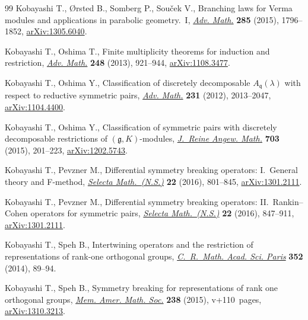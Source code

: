 \documentclass[pdftex]{sigma}
\numberwithin{equation}{section}
\begin{document}
\begin{thebibliography}{99}
Kobayashi T., {\O}rsted B., Somberg P., Sou\v{c}ek V., Branching laws for
 {V}erma modules and applications in parabolic geometry.~{I}, \href{https://doi.org/10.1016/j.aim.2015.08.020}{\textit{Adv.
 Math.}} \textbf{285} (2015), 1796--1852, \href{https://arxiv.org/abs/1305.6040}{arXiv:1305.6040}.

Kobayashi T., Oshima T., Finite multiplicity theorems for induction and
 restriction, \href{https://doi.org/10.1016/j.aim.2013.07.015}{\textit{Adv. Math.}} \textbf{248} (2013), 921--944,
 \href{https://arxiv.org/abs/1108.3477}{arXiv:1108.3477}.

Kobayashi T., Oshima Y., Classification of discretely decomposable
 {$A_{\mathfrak q}(\lambda)$} with respect to reductive symmetric pairs,
 \href{https://doi.org/10.1016/j.aim.2012.07.006}{\textit{Adv. Math.}} \textbf{231} (2012), 2013--2047, \href{https://arxiv.org/abs/1104.4400}{arXiv:1104.4400}.

Kobayashi T., Oshima Y., Classification of symmetric pairs with discretely
 decomposable restrictions of {$(\mathfrak{g},K)$}-modules, \href{https://doi.org/10.1515/crelle-2013-0045}{\textit{J.~Reine
 Angew. Math.}} \textbf{703} (2015), 201--223, \href{https://arxiv.org/abs/1202.5743}{arXiv:1202.5743}.

Kobayashi T., Pevzner M., Differential symmetry breaking operators:
 {I}.~{G}eneral theory and {F}-method, \href{https://doi.org/10.1007/s00029-015-0207-9}{\textit{Selecta Math.~(N.S.)}}
 \textbf{22} (2016), 801--845, \href{https://arxiv.org/abs/1301.2111}{arXiv:1301.2111}.

Kobayashi T., Pevzner M., Differential symmetry breaking operators:
 {II}.~{R}ankin--{C}ohen operators for symmetric pairs, \href{https://doi.org/10.1007/s00029-015-0208-8}{\textit{Selecta
 Math.~(N.S.)}} \textbf{22} (2016), 847--911, \href{https://arxiv.org/abs/1301.2111}{arXiv:1301.2111}.

Kobayashi T., Speh B., Intertwining operators and the restriction of
 representations of rank-one orthogonal groups, \href{https://doi.org/10.1016/j.crma.2013.11.018}{\textit{C.~R.~Math. Acad. Sci.
 Paris}} \textbf{352} (2014), 89--94.

Kobayashi T., Speh B., Symmetry breaking for representations of rank one
 orthogonal groups, \href{https://doi.org/10.1090/memo/1126}{\textit{Mem. Amer. Math. Soc.}} \textbf{238} (2015),
 v+110~pages, \href{https://arxiv.org/abs/1310.3213}{arXiv:1310.3213}.


\end{thebibliography}
\end{document}
